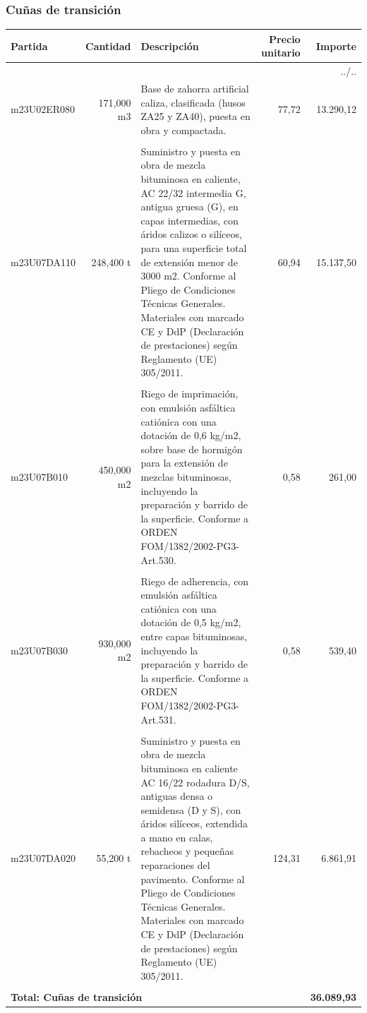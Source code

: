 \documentclass{book}%
\begin{document}
\subsubsection{Cuñas de transición}%
\small%
\begin{longtable}{lrlrr}%
Partida&Cantidad&Descripción&\multicolumn{1}{p{1.5cm}}{Precio unitario}&Importe\\%
\hline%
\endhead%
\multicolumn{5}{r}{../..}\\%
\endfoot%
\hline%
\endlastfoot%
m23U02ER080&   171,000 m3&\multicolumn{1}{p{5cm}}{Base de zahorra artificial caliza, clasificada (husos ZA25 y ZA40), puesta en obra y compactada.}&     77,72&13.290,12\\%
&&&&\\%
m23U07DA110&   248,400 t&\multicolumn{1}{p{5cm}}{Suministro y puesta en obra de mezcla bituminosa en caliente, AC 22/32 intermedia G, antigua gruesa (G), en capas intermedias, con áridos calizos o silíceos, para una superficie total de extensión menor de 3000 m2. Conforme al Pliego de Condiciones Técnicas Generales. Materiales con marcado CE y DdP (Declaración de prestaciones) según Reglamento (UE) 305/2011.}&     60,94&15.137,50\\%
&&&&\\%
m23U07B010&   450,000 m2&\multicolumn{1}{p{5cm}}{Riego de imprimación, con emulsión asfáltica catiónica con una dotación de 0,6 kg/m2, sobre base de hormigón para la extensión de mezclas bituminosas, incluyendo la preparación y barrido de la superficie. Conforme a ORDEN FOM/1382/2002{-}PG3{-}Art.530.}&      0,58&261,00\\%
&&&&\\%
m23U07B030&   930,000 m2&\multicolumn{1}{p{5cm}}{Riego de adherencia, con emulsión asfáltica catiónica con una dotación de 0,5 kg/m2, entre capas bituminosas, incluyendo la preparación y barrido de la superficie. Conforme a ORDEN FOM/1382/2002{-}PG3{-}Art.531.}&      0,58&539,40\\%
&&&&\\%
m23U07DA020&    55,200 t&\multicolumn{1}{p{5cm}}{Suministro y puesta en obra de mezcla bituminosa en caliente AC 16/22 rodadura D/S, antiguas densa o semidensa (D y S), con áridos silíceos, extendida a mano en calas, rebacheos y pequeñas reparaciones del pavimento. Conforme al Pliego de Condiciones Técnicas Generales. Materiales con marcado CE y DdP (Declaración de prestaciones) según Reglamento (UE) 305/2011.}&    124,31&6.861,91\\%
&&&&\\%
\multicolumn{4}{p{8cm}}{\textbf{Total: Cuñas de transición}}&\textbf{36.089,93}\\%
\end{longtable}%
\normalsize
\end{document}
